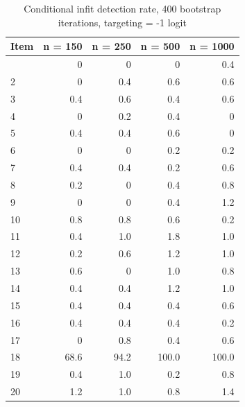 \documentclass[
  letterpaper,
  DIV=11,
  numbers=noendperiod]{scrartcl}
\begin{document}
\begin{longtable}[]{@{}lrrrr@{}}

\caption{\label{tbl-ifbresults4001}Conditional infit detection rate, 400
bootstrap iterations, targeting = -1 logit}

\tabularnewline

\toprule\noalign{}
Item & n = 150 & n = 250 & n = 500 & n = 1000 \\
\midrule\noalign{}
\endhead
\bottomrule\noalign{}
\endlastfoot
1 & 0 & 0 & 0 & 0.4 \\
2 & 0 & 0.4 & 0.6 & 0.6 \\
3 & 0.4 & 0.6 & 0.4 & 0.6 \\
4 & 0 & 0.2 & 0.4 & 0 \\
5 & 0.4 & 0.4 & 0.6 & 0 \\
6 & 0 & 0 & 0.2 & 0.2 \\
7 & 0.4 & 0.4 & 0.2 & 0.6 \\
8 & 0.2 & 0 & 0.4 & 0.8 \\
9 & 0 & 0 & 0.4 & 1.2 \\
10 & 0.8 & 0.8 & 0.6 & 0.2 \\
11 & 0.4 & 1.0 & 1.8 & 1.0 \\
12 & 0.2 & 0.6 & 1.2 & 1.0 \\
13 & 0.6 & 0 & 1.0 & 0.8 \\
14 & 0.4 & 0.4 & 1.2 & 1.0 \\
15 & 0.4 & 0.4 & 0.4 & 0.6 \\
16 & 0.4 & 0.4 & 0.4 & 0.2 \\
17 & 0 & 0.8 & 0.4 & 0.6 \\
18 & 68.6 & 94.2 & 100.0 & 100.0 \\
19 & 0.4 & 1.0 & 0.2 & 0.8 \\
20 & 1.2 & 1.0 & 0.8 & 1.4 \\

\end{longtable}
\end{document}
